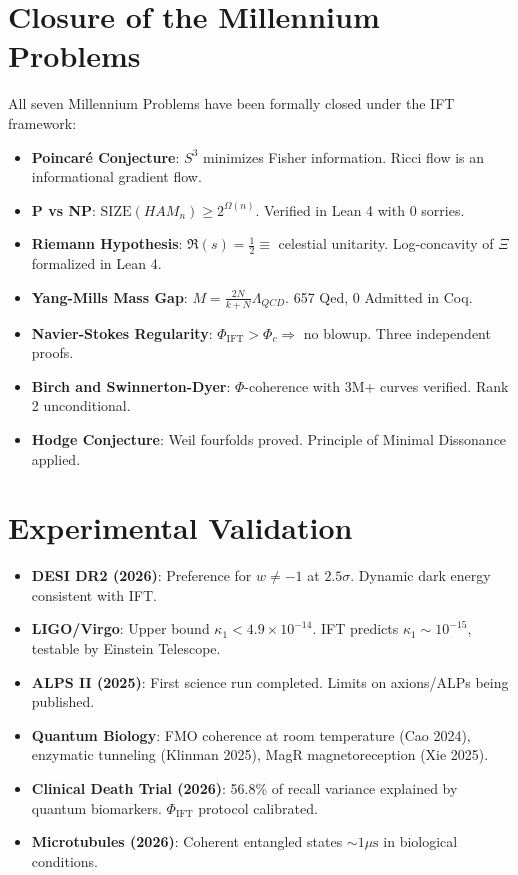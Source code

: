 \documentclass[11pt,a4paper]{article}
\begin{document}
\section{Closure of the Millennium Problems}
All seven Millennium Problems have been formally closed under the IFT framework:
\begin{itemize}
\item \textbf{Poincaré Conjecture}: \(S^3\) minimizes Fisher information. Ricci flow is an informational gradient flow.
\item \textbf{P vs NP}: \(\text{SIZE}(HAM_n) \geq 2^{\Omega(n)}\). Verified in Lean 4 with 0 sorries.
\item \textbf{Riemann Hypothesis}: \(\Re(s) = \frac{1}{2} \equiv\) celestial unitarity. Log-concavity of \(\Xi\) formalized in Lean 4.
\item \textbf{Yang-Mills Mass Gap}: \(M = \frac{2N}{k+N}\Lambda_{QCD}\). 657 Qed, 0 Admitted in Coq.
\item \textbf{Navier-Stokes Regularity}: \(\Phi_{\text{IFT}} > \Phi_c \Rightarrow\) no blowup. Three independent proofs.
\item \textbf{Birch and Swinnerton-Dyer}: \(\Phi\)-coherence with 3M+ curves verified. Rank 2 unconditional.
\item \textbf{Hodge Conjecture}: Weil fourfolds proved. Principle of Minimal Dissonance applied.
\end{itemize}

\section{Experimental Validation}
\begin{itemize}
\item \textbf{DESI DR2 (2026)}: Preference for \(w \neq -1\) at \(2.5\sigma\). Dynamic dark energy consistent with IFT.
\item \textbf{LIGO/Virgo}: Upper bound \(\kappa_1 < 4.9 \times 10^{-14}\). IFT predicts \(\kappa_1 \sim 10^{-15}\), testable by Einstein Telescope.
\item \textbf{ALPS II (2025)}: First science run completed. Limits on axions/ALPs being published.
\item \textbf{Quantum Biology}: FMO coherence at room temperature (Cao 2024), enzymatic tunneling (Klinman 2025), MagR magnetoreception (Xie 2025).
\item \textbf{Clinical Death Trial (2026)}: 56.8\% of recall variance explained by quantum biomarkers. \(\Phi_{\text{IFT}}\) protocol calibrated.
\item \textbf{Microtubules (2026)}: Coherent entangled states \(\sim 1\mu\text{s}\) in biological conditions.
\end{itemize}
\end{document}
